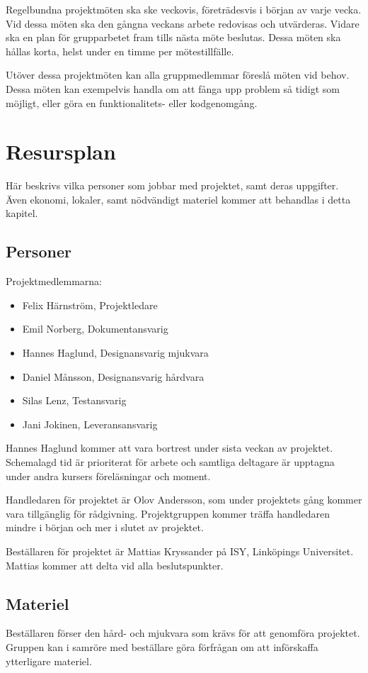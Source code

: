 \documentclass[a4paper,11pt]{article}
\newcommand{\LIPShandledare}{Olov Andersson}
\begin{document}
Regelbundna projektmöten ska ske veckovis, företrädesvis i början av varje vecka. Vid dessa möten ska den gångna veckans arbete redovisas och utvärderas. Vidare ska en plan för grupparbetet fram tills nästa möte beslutas. Dessa möten ska hållas korta, helst under en timme per mötestillfälle. 

Utöver dessa projektmöten kan alla gruppmedlemmar föreslå möten vid behov. Dessa möten kan exempelvis handla om att fånga upp problem så tidigt som möjligt, eller göra en funktionalitets- eller kodgenomgång.

\section{Resursplan}
Här beskrivs vilka personer som jobbar med projektet, samt deras uppgifter. Även ekonomi, lokaler, samt nödvändigt materiel kommer att behandlas i detta kapitel.

\subsection{Personer}
Projektmedlemmarna:
\begin{itemize}
	\item Felix Härnström, Projektledare
	\item Emil Norberg, Dokumentansvarig
	\item Hannes Haglund, Designansvarig mjukvara
	\item Daniel Månsson, Designansvarig hårdvara
	\item Silas Lenz, Testansvarig
	\item Jani Jokinen, Leveransansvarig
\end{itemize}
Hannes Haglund kommer att vara bortrest under sista veckan av projektet.
Schemalagd tid är prioriterat för arbete och samtliga deltagare är upptagna under andra kursers föreläsningar och moment.

Handledaren för projektet är \LIPShandledare , som under projektets gång kommer vara tillgänglig för rådgivning. Projektgruppen kommer träffa handledaren mindre i början och mer i slutet av projektet.

Beställaren för projektet är  Mattias Kryssander på ISY, Linköpings Universitet. Mattias kommer att delta vid alla beslutspunkter.

\subsection{Materiel}
Beställaren förser den hård- och mjukvara som krävs för att genomföra projektet. Gruppen kan i samröre med beställare göra förfrågan om att införskaffa ytterligare materiel. 
\end{document}
